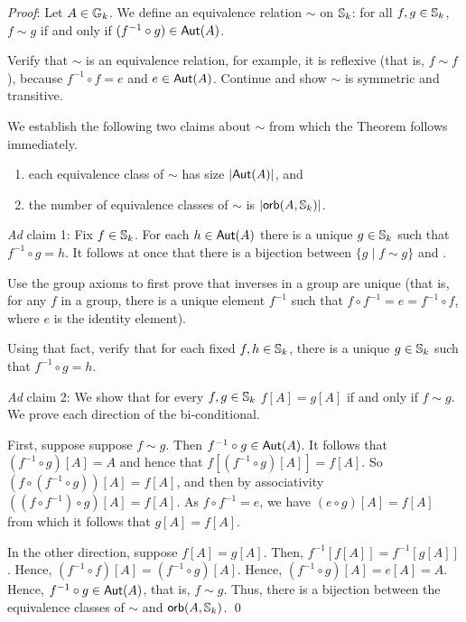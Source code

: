 \emph{Proof}:
Let $A\in\mbox{$\mathbb{G}_{k}$}$. We define an equivalence relation $\sim$ on $\mbox{$\mathbb{S}_{k}$}$: for all $f,g\in\mbox{$\mathbb{S}_{k}$}$, $f\sim g$ if and only if $(f^{-1}\circ g)\in\mbox{$\mathsf{Aut}(A)$}$. 

\begin{aside}
    Verify that $\sim$ is an equivalence relation, for example, it is reflexive (that is, $f\sim f$), because $f^{-1}\circ f = e$ and $e\in \mbox{$\mathsf{Aut}(A)$}$. Continue and show $\sim$ is symmetric and transitive.
\end{aside}


We establish the following two claims about $\sim$ from which the Theorem follows immediately.
\begin{enumerate}
\item
each equivalence class of $\sim$ has size $\mbox{$|\mbox{$\mathsf{Aut}(A)$}|$}$, and
\item
the number of equivalence classes of $\sim$ is $\mbox{$|\mbox{$\mathsf{orb}(A,\mbox{$\mathbb{S}_{k}$})$}|$}$.
\end{enumerate}
\emph{Ad} claim 1: Fix $f\in\mbox{$\mathbb{S}_{k}$}$. For each $h\in\mbox{$\mathsf{Aut}(A)$}$ there is a unique $g\in\mbox{$\mathbb{S}_{k}$}$ such that $f^{-1}\circ g = h$. It follows at once that there is a bijection between $\{g\mid f\sim g\}$ and .

\begin{aside}
    Use the group axioms to first prove that inverses in a group are unique (that is, for any $f$ in a group, there is a unique element $f^{-1}$ such that $f \circ f^{-1} = e = f^{-1} \circ f$, where $e$ is the identity element).

    Using that fact, verify that for each fixed $f, h \in \mbox{$\mathbb{S}_{k}$}$, there is a unique $g \in \mbox{$\mathbb{S}_{k}$}$ such that $f^{-1}\circ g = h$. 
\end{aside}

\emph{Ad} claim 2: We show that for every $f,g\in\mbox{$\mathbb{S}_{k}$}$ $f[A]=g[A]$ if and only if $f\sim g$. We prove each direction of the bi-conditional. 

First, suppose suppose $f\sim g$. Then 
$f^{-1}\circ g \in \mbox{$\mathsf{Aut}(A)$}$. It follows that $(f^{-1}\circ g)[A] = A$ and hence that $f[(f^{-1}\circ g)[A]] = f[A]$. So $(f\circ(f^{-1}\circ g))[A] = f[A]$, and then by associativity $((f\circ f^{-1})\circ g)[A] = f[A]$. As $f \circ f^{-1} = e$, we have $(e\circ g)[A] = f[A]$ from which it follows that $g[A]=f[A]$. 

In the other direction, suppose $f[A]=g[A]$. Then, $f^{-1}[f[A]]=f^{-1}[g[A]]$. Hence, $(f^{-1}\circ f)[A]=(f^{-1}\circ g)[A]$. Hence, $(f^{-1}\circ g)[A]=e[A]= A$. Hence, $f^{-1}\circ g\in \mbox{$\mathsf{Aut}(A)$}$, that is, $f\sim g$. Thus, there is a bijection between the equivalence classes of $\sim$ and $\mbox{$\mathsf{orb}(A,\mbox{$\mathbb{S}_{k}$})$}$. \qed

